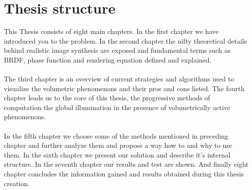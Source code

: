 
\newpage
\section{Thesis structure}
This Thesis consists of eight main chapters. In the first chapter we have introduced you to the problem. In the second chapter the nifty theoretical details behind realistic image synthesis are exposed and fundamental terms such as BRDF, phase function and rendering equation defined and explained.
\\
\\
The third chapter is an overview of current strategies and algorithms used to visualize the volumetric phenomenons and their pros and cons listed. The fourth chapter leads us to the core of this thesis, the progressive methods of computation the global illumination in the presence of volumetrically active phenomenons.
\\
\\
In the fifth chapter we choose some of the methods mentioned in preceding chapter and further analyze them and propose a way how to and why to use them. In the sixth chapter we present our solution and describe it's internal structure. In the seventh chapter our results and test are shown. And finally eight chapter concludes the information gained and results obtained during this thesis creation.
\\


%
%   
%
%
%
%
%
%



